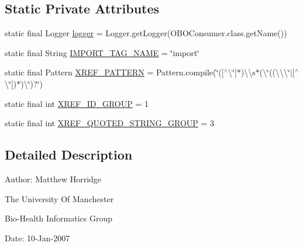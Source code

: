 \subsection*{Static Private Attributes}
\begin{DoxyCompactItemize}
\item 
static final Logger \hyperlink{classorg_1_1coode_1_1owlapi_1_1obo_1_1parser_1_1_o_b_o_consumer_a2ae0770e0afa83dc4a394d02c4fdd24c}{logger} = Logger.\-get\-Logger(O\-B\-O\-Consumer.\-class.\-get\-Name())
\item 
static final String \hyperlink{classorg_1_1coode_1_1owlapi_1_1obo_1_1parser_1_1_o_b_o_consumer_acbce08f483e8885992e53e5e81fe6407}{I\-M\-P\-O\-R\-T\-\_\-\-T\-A\-G\-\_\-\-N\-A\-M\-E} = \char`\"{}import\char`\"{}
\item 
static final Pattern \hyperlink{classorg_1_1coode_1_1owlapi_1_1obo_1_1parser_1_1_o_b_o_consumer_a02e6bc2edeec7bfb8a8babb7a3dfc197}{X\-R\-E\-F\-\_\-\-P\-A\-T\-T\-E\-R\-N} = Pattern.\-compile(\char`\"{}(\mbox{[}$^\wedge$\textbackslash{}\char`\"{}\mbox{]}$\ast$)\textbackslash{}\textbackslash{}s$\ast$(\textbackslash{}\char`\"{}((\textbackslash{}\textbackslash{}\textbackslash{}\char`\"{}$|$\mbox{[}$^\wedge$\textbackslash{}\char`\"{}\mbox{]})$\ast$)\textbackslash{}\char`\"{})?\char`\"{})
\item 
static final int \hyperlink{classorg_1_1coode_1_1owlapi_1_1obo_1_1parser_1_1_o_b_o_consumer_af8d728337f29186a229a7bb9303db3a3}{X\-R\-E\-F\-\_\-\-I\-D\-\_\-\-G\-R\-O\-U\-P} = 1
\item 
static final int \hyperlink{classorg_1_1coode_1_1owlapi_1_1obo_1_1parser_1_1_o_b_o_consumer_add3429e6d074701321701c0205751b61}{X\-R\-E\-F\-\_\-\-Q\-U\-O\-T\-E\-D\-\_\-\-S\-T\-R\-I\-N\-G\-\_\-\-G\-R\-O\-U\-P} = 3
\end{DoxyCompactItemize}


\subsection{Detailed Description}
Author\-: Matthew Horridge\par
 The University Of Manchester\par
 Bio-\/\-Health Informatics Group\par
 Date\-: 10-\/\-Jan-\/2007\par
\par
 

